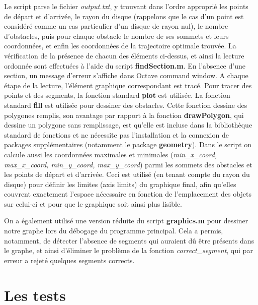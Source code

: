 \documentclass[12pt]{article}
\begin{document}
	Le script parse le fichier \textit{output.txt}, y trouvant dans l'ordre approprié les points de départ et d'arrivée, le rayon du disque (rappelons que le cas d'un point est considéré comme un cas particulier d'un disque de rayon nul), le nombre d'obstacles, puis pour chaque obstacle le nombre de ses sommets et leurs coordonnées, et enfin les coordonnées de la trajectoire optimale trouvée. La vérification de la présence de chacun des éléments ci-dessus, et ainsi la lecture ordonnée sont effectuées à l'aide du script \textbf{findSection.m}. En l'absence d’une section, un message d'erreur s'affiche dans Octave command window. A chaque étape de la lecture, l'élément graphique correspondant est tracé. Pour tracer des points et des segments, la fonction standard \textbf{plot} est utilisée. La fonction standard \textbf{fill} est utilisée pour dessiner des obstacles. Cette fonction dessine des polygones remplis, son avantage par rapport à la fonction \textbf{drawPolygon}, qui dessine un polygone sans remplissage, est qu'elle est incluse dans la bibliothèque standard de fonctions et ne nécessite pas l'installation et la connexion de packages supplémentaires (notamment le package \textbf{geometry}). Dans le script on calcule aussi les coordonnées maximales et minimales (\textit{min\_x\_coord, max\_x\_coord, min\_y\_coord, max\_y\_coord}) parmi les sommets des obstacles et les points de départ et d'arrivée. Ceci est utilisé (en tenant compte du rayon du disque) pour définir les limites (axis limits) du graphique final, afin qu'elles couvrent exactement l'espace nécessaire en fonction de l'emplacement des objets sur celui-ci et pour que le graphique soit ainsi plus lisible.
	
	On a également utilisé une version réduite du script \textbf{graphics.m} pour dessiner notre graphe lors du débogage du programme principal. Cela a permis, notamment, de détecter l'absence de segments qui auraient dû être présents dans le graphe, et ainsi d'éliminer le problème de la fonction \textit{correct\_segment}, qui par erreur a rejeté quelques segments corrects.
	
	\section{Les tests}
\end{document}
